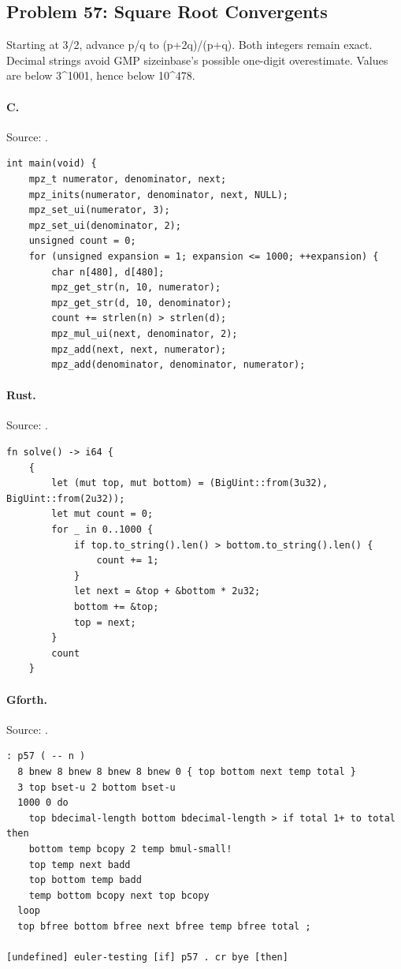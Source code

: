 \subsection{Problem 57: Square Root Convergents}
\label{walkthrough:p57}
Starting at 3/2, advance p/q to (p+2q)/(p+q). Both integers remain exact. Decimal strings avoid GMP sizeinbase's possible one-digit overestimate. Values are below 3\textasciicircum{}1001, hence below 10\textasciicircum{}478.

\paragraph{C.} Source: .
\begin{lstlisting}
int main(void) {
    mpz_t numerator, denominator, next;
    mpz_inits(numerator, denominator, next, NULL);
    mpz_set_ui(numerator, 3);
    mpz_set_ui(denominator, 2);
    unsigned count = 0;
    for (unsigned expansion = 1; expansion <= 1000; ++expansion) {
        char n[480], d[480];
        mpz_get_str(n, 10, numerator);
        mpz_get_str(d, 10, denominator);
        count += strlen(n) > strlen(d);
        mpz_mul_ui(next, denominator, 2);
        mpz_add(next, next, numerator);
        mpz_add(denominator, denominator, numerator);
\end{lstlisting}

\paragraph{Rust.} Source: .
\begin{lstlisting}
fn solve() -> i64 {
    {
        let (mut top, mut bottom) = (BigUint::from(3u32), BigUint::from(2u32));
        let mut count = 0;
        for _ in 0..1000 {
            if top.to_string().len() > bottom.to_string().len() {
                count += 1;
            }
            let next = &top + &bottom * 2u32;
            bottom += &top;
            top = next;
        }
        count
    }
\end{lstlisting}

\paragraph{Gforth.} Source: .
\begin{lstlisting}
: p57 ( -- n )
  8 bnew 8 bnew 8 bnew 8 bnew 0 { top bottom next temp total }
  3 top bset-u 2 bottom bset-u
  1000 0 do
    top bdecimal-length bottom bdecimal-length > if total 1+ to total then
    bottom temp bcopy 2 temp bmul-small!
    top temp next badd
    top bottom temp badd
    temp bottom bcopy next top bcopy
  loop
  top bfree bottom bfree next bfree temp bfree total ;

[undefined] euler-testing [if] p57 . cr bye [then]
\end{lstlisting}


